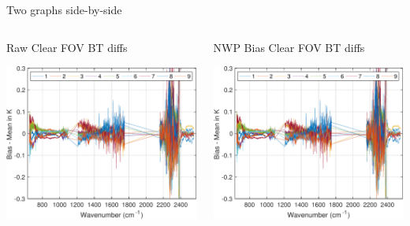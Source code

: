 \documentclass[10pt,t]{beamer}
\begin{document}
\begin{frame}[label={sec:orgb987c5f}]{Two graphs side-by-side}
  \begin{columns}
    \begin{column}{0.55\columnwidth}
      \begin{block}{Raw Clear FOV BT diffs}
        \begin{center}
          \includegraphics[width=\linewidth]{./testfig.pdf}
        \end{center}
      \end{block}
    \end{column}

    \begin{column}{0.55\columnwidth}
      \begin{block}{NWP Bias Clear FOV BT diffs}
        \begin{center}
          \includegraphics[width=\linewidth]{./testfig.pdf}
        \end{center}
      \end{block}
    \end{column}
  \end{columns}


\end{frame}
\end{document}
